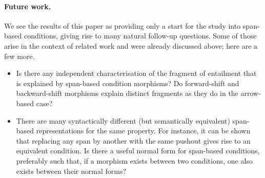 \paragraph{Future work.}

We see the results of this paper as providing only a start for the study into span-based conditions, giving rise to many natural follow-up questions. Some of those arise in the context of related work and were already discussed above; here are a few more.
%
\begin{itemize}
\item Is there any independent characterisation of the fragment of entailment that is explained by span-based condition morphisms? Do forward-shift and backward-shift morphisms explain distinct fragments as they do in the arrow-based case?

\item There are many syntactically different (but semantically equivalent) span-based representations for the same property. For instance, it can be shown that replacing any span by another with the same pushout gives rise to an equivalent condition. Is there a useful normal form for span-based conditions, preferably such that, if a morphism exists between two conditions, one also exists between their normal forms?
%
\end{itemize}
